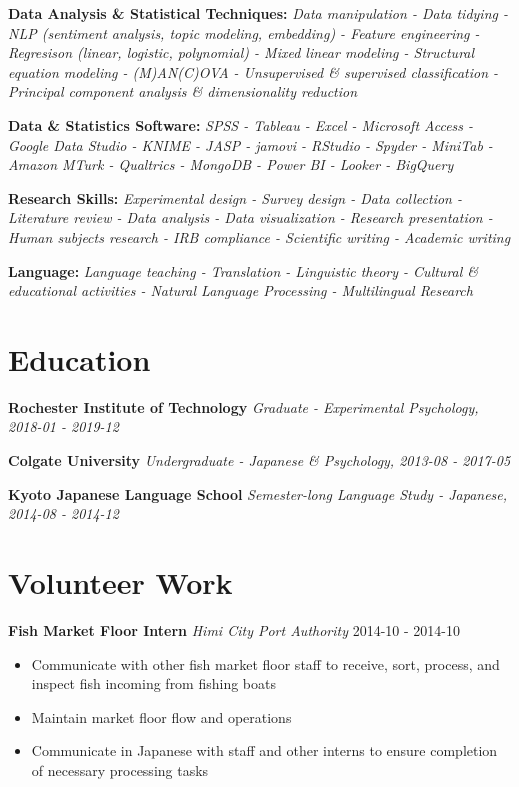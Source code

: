 \documentclass[a4paper,9pt]{extarticle}
\begin{document}
\noindent
\textbf{Data Analysis \& Statistical Techniques:}
\textit{Data manipulation - Data tidying - NLP (sentiment analysis, topic modeling, embedding) - Feature engineering - Regresison (linear, logistic, polynomial) - Mixed linear modeling - Structural equation modeling - (M)AN(C)OVA - Unsupervised \& supervised classification - Principal component analysis \& dimensionality reduction}

\noindent
\textbf{Data \& Statistics Software:}
\textit{SPSS - Tableau - Excel - Microsoft Access - Google Data Studio - KNIME - JASP - jamovi - RStudio - Spyder - MiniTab - Amazon MTurk - Qualtrics - MongoDB - Power BI - Looker - BigQuery}

\noindent
\textbf{Research Skills:}
\textit{Experimental design - Survey design - Data collection - Literature review - Data analysis - Data visualization - Research presentation - Human subjects research - IRB compliance - Scientific writing - Academic writing}

\noindent
\textbf{Language:}
\textit{Language teaching - Translation - Linguistic theory - Cultural \& educational activities - Natural Language Processing - Multilingual Research}

\section*{Education}

\noindent
\textbf{Rochester Institute of Technology}
\textit{Graduate - Experimental Psychology, 2018-01 - 2019-12}

\noindent
\textbf{Colgate University}
\textit{Undergraduate - Japanese \& Psychology, 2013-08 - 2017-05}

\noindent
\textbf{Kyoto Japanese Language School}
\textit{Semester-long Language Study - Japanese, 2014-08 - 2014-12}

\section*{Volunteer Work}

\noindent
\textbf{Fish Market Floor Intern}
\noindent
\textit{Himi City Port Authority} \hfill 2014-10 - 2014-10
\begin{itemize}
\item Communicate with other fish market floor staff to receive, sort, process, and inspect fish incoming from fishing boats
\item Maintain market floor flow and operations
\item Communicate in Japanese with staff and other interns to ensure completion of necessary processing tasks
\end{itemize}
\end{document}

